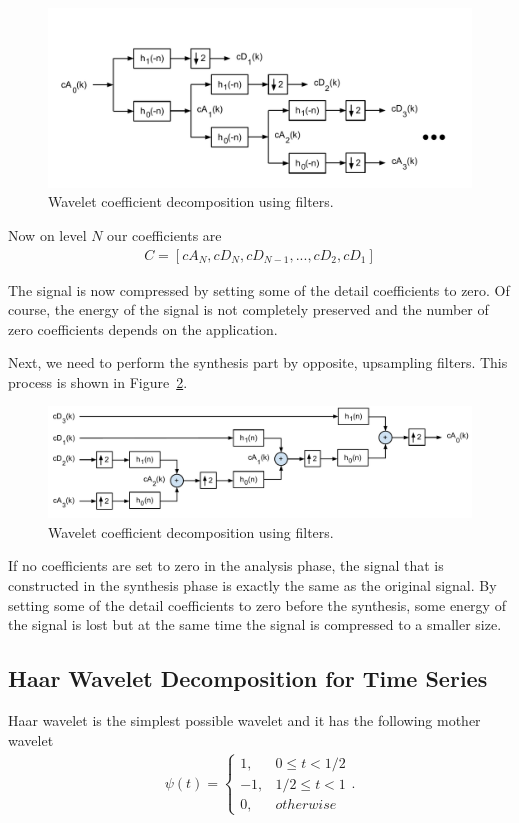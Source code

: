 \begin{figure}[here]
\centering
\includegraphics[scale=0.7]{images/wavelet_filters.pdf}
\caption{Wavelet coefficient decomposition using filters.}
\label{fig:wavelet_filters}
\end{figure}

Now on level $N$ our coefficients are
\begin{align}
C = [cA_N, cD_N, cD_{N-1}, ..., cD_2, cD_1]
\end{align}

The signal is now compressed by setting some of the detail coefficients to zero. Of course, the energy of the signal is not completely preserved and the number of zero coefficients depends on the application.

Next, we need to perform the synthesis part by opposite, upsampling filters. This process is shown in Figure~\ref{fig:wavelet_filters2}.

\begin{figure}[here]
\centering
\includegraphics[scale=0.55]{images/wavelet_filters2.pdf}
\caption{Wavelet coefficient decomposition using filters.}
\label{fig:wavelet_filters2}
\end{figure}

If no coefficients are set to zero in the analysis phase, the signal that is constructed in the synthesis phase is exactly the same as the original signal. By setting some of the detail coefficients to zero before the synthesis, some energy of the signal is lost but at the same time the signal is compressed to a smaller size.


\subsection{Haar Wavelet Decomposition for Time Series}
Haar wavelet \cite{struzik99} is the simplest possible wavelet and it has the following mother wavelet 
\begin{align}
\psi(t) = 
\begin{cases}
1, & 0 \le t < 1/2 \\
-1, & 1/2 \le t < 1 \\
0, & otherwise
\end{cases}.
\end{align}

